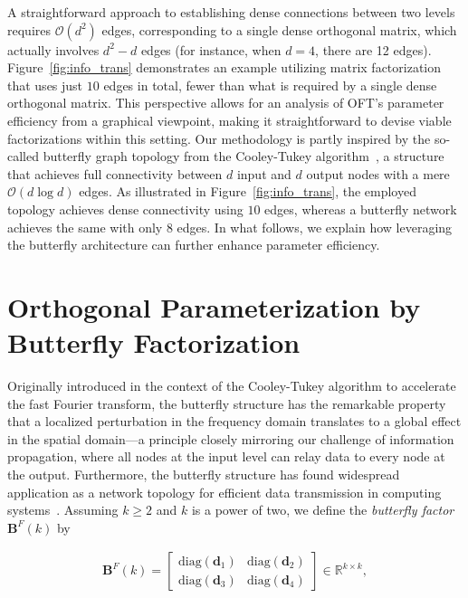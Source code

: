 A straightforward approach to establishing dense connections between two levels requires $\mathcal{O}(d^2)$ edges, corresponding to a single dense orthogonal matrix, which actually involves $d^2 - d$ edges (for instance, when $d=4$, there are 12 edges). Figure~\ref{fig:info_trans} demonstrates an example utilizing matrix factorization that uses just $10$ edges in total, fewer than what is required by a single dense orthogonal matrix. This perspective allows for an analysis of OFT’s parameter efficiency from a graphical viewpoint, making it straightforward to devise viable factorizations within this setting. Our methodology is partly inspired by the so-called butterfly graph topology from the Cooley-Tukey algorithm~\cite{cooley1965algorithm}, a structure that achieves full connectivity between $d$ input and $d$ output nodes with a mere $\mathcal{O}(d\log d)$ edges. As illustrated in Figure~\ref{fig:info_trans}, the employed topology achieves dense connectivity using $10$ edges, whereas a butterfly network achieves the same with only $8$ edges. In what follows, we explain how leveraging the butterfly architecture can further enhance parameter efficiency.

\section{Orthogonal Parameterization by Butterfly Factorization}

Originally introduced in the context of the Cooley-Tukey algorithm to accelerate the fast Fourier transform, the butterfly structure has the remarkable property that a localized perturbation in the frequency domain translates to a global effect in the spatial domain—a principle closely mirroring our challenge of information propagation, where all nodes at the input level can relay data to every node at the output. Furthermore, the butterfly structure has found widespread application as a network topology for efficient data transmission in computing systems~\cite{solihin2015fundamentals,li2011linear}. Assuming $k\geq 2$ and $k$ is a power of two, we define the \emph{butterfly factor} $\bm{B}^F(k)$ by

\begin{equation}\label{eq:but_factor}
\begin{aligned}
    \bm{B}^F(k)=\begin{bmatrix}
    \text{diag}(\bm{d}_1) & \text{diag}(\bm{d}_2) \\
    \text{diag}(\bm{d}_3) & \text{diag}(\bm{d}_4)
    \end{bmatrix}\in\mathbb{R}^{k\times k},
\end{aligned}
\end{equation}

